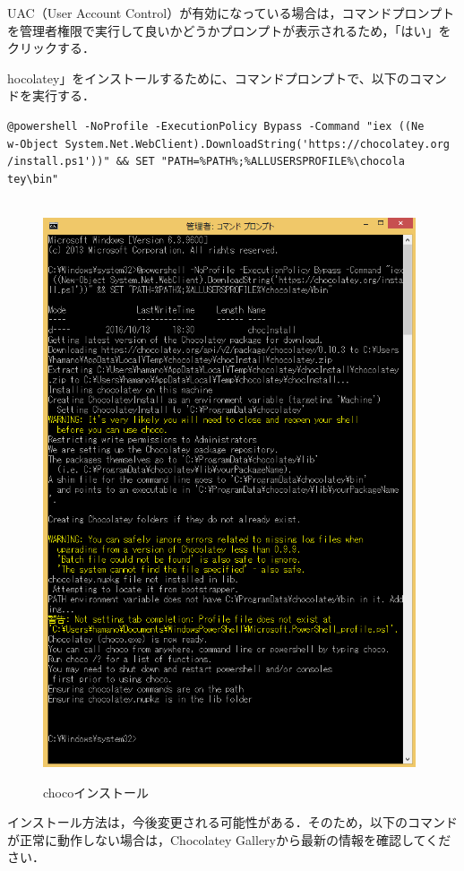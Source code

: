 UAC（User Account Control）が有効になっている場合は，コマンドプロンプトを管理者権限で実行して良いかどうかプロンプトが表示されるため，「はい」をクリックする．



hocolatey」をインストールするために、コマンドプロンプトで、以下のコマンドを実行する．

\begin{lstlisting}[basicstyle=\ttfamily\footnotesize, frame=single]
@powershell -NoProfile -ExecutionPolicy Bypass -Command "iex ((Ne
w-Object System.Net.WebClient).DownloadString('https://chocolatey.org
/install.ps1'))" && SET "PATH=%PATH%;%ALLUSERSPROFILE%\chocola
tey\bin"
\end{lstlisting}

\newpage

\begin{figure}[htb]
\centering　
\includegraphics[width=11cm]{choco2.png}
\caption{chocoインストール}\label{tab:uac}
\end{figure}


インストール方法は，今後変更される可能性がある．そのため，以下のコマンドが正常に動作しない場合は，Chocolatey Galleryから最新の情報を確認してください．

